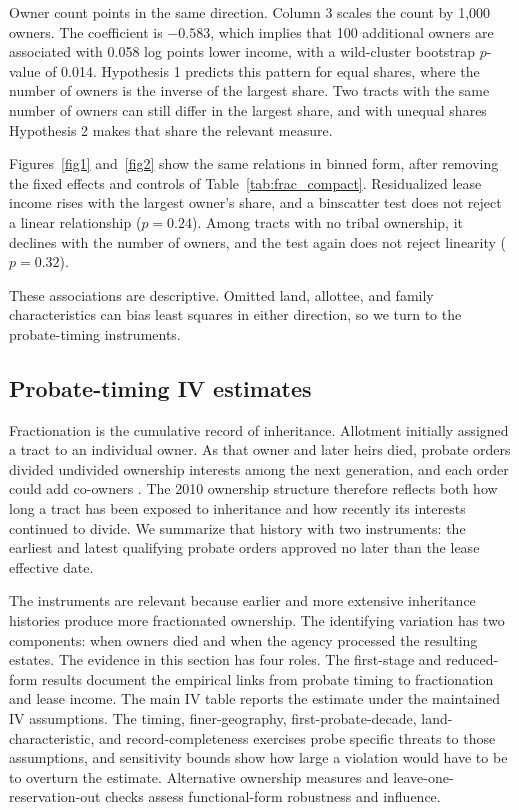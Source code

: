 \documentclass[12pt]{article}
\begin{document}
Owner count points in the same direction. Column 3 scales the count by 1,000 owners. The coefficient is $-0.583$, which implies that 100 additional owners are associated with 0.058 log points lower income, with a wild-cluster bootstrap $p$-value of 0.014. Hypothesis 1 predicts this pattern for equal shares, where the number of owners is the inverse of the largest share. Two tracts with the same number of owners can still differ in the largest share, and with unequal shares Hypothesis 2 makes that share the relevant measure.

Figures~\ref{fig1} and~\ref{fig2} show the same relations in binned form, after removing the fixed effects and controls of Table~\ref{tab:frac_compact}. Residualized lease income rises with the largest owner's share, and a binscatter test does not reject a linear relationship ($p=0.24$). Among tracts with no tribal ownership, it declines with the number of owners, and the test again does not reject linearity ($p=0.32$).

These associations are descriptive. Omitted land, allottee, and family characteristics can bias least squares in either direction, so we turn to the probate-timing instruments.

\subsection{Probate-timing IV estimates} \label{Identification}

Fractionation is the cumulative record of inheritance. Allotment initially assigned a tract to an individual owner. As that owner and later heirs died, probate orders divided undivided ownership interests among the next generation, and each order could add co-owners \citep{Shoemaker2014}. The 2010 ownership structure therefore reflects both how long a tract has been exposed to inheritance and how recently its interests continued to divide. We summarize that history with two instruments: the earliest and latest qualifying probate orders approved no later than the lease effective date.

The instruments are relevant because earlier and more extensive inheritance histories produce more fractionated ownership. The identifying variation has two components: when owners died and when the agency processed the resulting estates. The evidence in this section has four roles. The first-stage and reduced-form results document the empirical links from probate timing to fractionation and lease income. The main IV table reports the estimate under the maintained IV assumptions. The timing, finer-geography, first-probate-decade, land-characteristic, and record-completeness exercises probe specific threats to those assumptions, and sensitivity bounds show how large a violation would have to be to overturn the estimate. Alternative ownership measures and leave-one-reservation-out checks assess functional-form robustness and influence.
\end{document}
